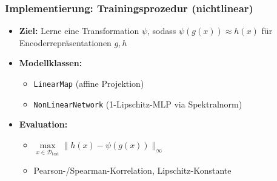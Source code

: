 \begingroup
\frametitle{Implementierung: Trainingsprozedur (nichtlinear)}
\begin{frame}
	\footnotesize
	\begin{itemize}
		\item \textbf{Ziel:} Lerne eine Transformation \( \psi \), sodass \( \psi(g(x)) \approx h(x) \) für Encoderrepräsentationen \( g, h \)
		\item \textbf{Modellklassen:}
		\begin{itemize}
			\item \texttt{LinearMap} (affine Projektion)
			\item \texttt{NonLinearNetwork} (1-Lipschitz-MLP via Spektralnorm)
		\end{itemize}
		\item \textbf{Evaluation:}
		\begin{itemize}
			\item \( \max\limits_{x \in \mathcal{D}_{\text{test}}} \| h(x) - \psi(g(x)) \|_\infty \)
			\item Pearson-/Spearman-Korrelation, Lipschitz-Konstante
		\end{itemize}
	\end{itemize}
	
\end{frame}
\endgroup


